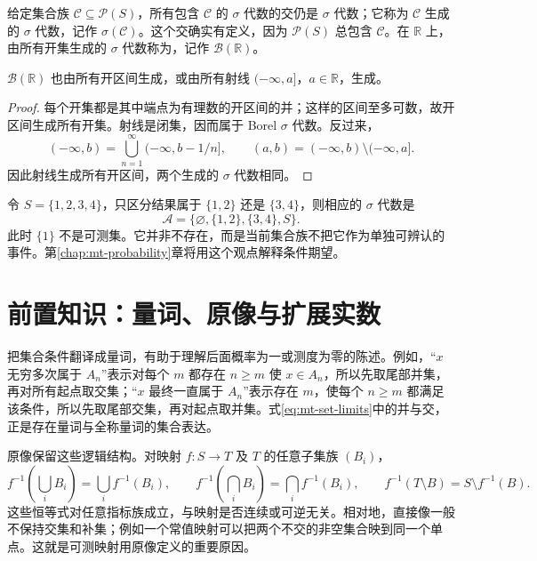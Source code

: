 \documentclass[UTF8,12pt,a4paper,fontset=fandol]{ctexbook}
\begin{document}
给定集合族 $\mathcal C\subseteq\mathcal P(S)$，所有包含 $\mathcal C$ 的 $\sigma$ 代数的交仍是 $\sigma$ 代数；它称为 $\mathcal C$ 生成的 $\sigma$ 代数，记作 $\sigma(\mathcal C)$。这个交确实有定义，因为 $\mathcal P(S)$ 总包含 $\mathcal C$。在 $\mathbb R$ 上，由所有开集生成的 $\sigma$ 代数称为，记作 $\mathcal B(\mathbb R)$。

\begin{proposition}
$\mathcal B(\mathbb R)$ 也由所有开区间生成，或由所有射线 $(-\infty,a]$，$a\in\mathbb R$，生成。
\end{proposition}
\begin{proof}
每个开集都是其中端点为有理数的开区间的并；这样的区间至多可数，故开区间生成所有开集。射线是闭集，因而属于 Borel $\sigma$ 代数。反过来，
\[
 (-\infty,b)=\bigcup_{n=1}^{\infty}(-\infty,b-1/n],\qquad
 (a,b)=(-\infty,b)\setminus(-\infty,a].
\]
因此射线生成所有开区间，两个生成的 $\sigma$ 代数相同。
\end{proof}

\begin{example}[有限信息对应的集合族]
令 $S=\{1,2,3,4\}$，只区分结果属于 $\{1,2\}$ 还是 $\{3,4\}$，则相应的 $\sigma$ 代数是
\[
 \mathcal A=\{\varnothing,\{1,2\},\{3,4\},S\}.
\]
此时 $\{1\}$ 不是可测集。它并非不存在，而是当前集合族不把它作为单独可辨认的事件。第\ref{chap:mt-probability}章将用这个观点解释条件期望。
\end{example}

\section{前置知识：量词、原像与扩展实数}
\label{sec:mt-logical-tools}
把集合条件翻译成量词，有助于理解后面概率为一或测度为零的陈述。例如，“$x$ 无穷多次属于 $A_n$”表示对每个 $m$ 都存在 $n\geq m$ 使 $x\in A_n$，所以先取尾部并集，再对所有起点取交集；“$x$ 最终一直属于 $A_n$”表示存在 $m$，使每个 $n\geq m$ 都满足该条件，所以先取尾部交集，再对起点取并集。式\eqref{eq:mt-set-limits}中的并与交，正是存在量词与全称量词的集合表达。

原像保留这些逻辑结构。对映射 $f:S\to T$ 及 $T$ 的任意子集族 $(B_i)$，
\[
 f^{-1}\!\left(\bigcup_iB_i\right)=\bigcup_if^{-1}(B_i),\qquad
 f^{-1}\!\left(\bigcap_iB_i\right)=\bigcap_if^{-1}(B_i),\qquad
 f^{-1}(T\setminus B)=S\setminus f^{-1}(B).
\]
这些恒等式对任意指标族成立，与映射是否连续或可逆无关。相对地，直接像一般不保持交集和补集；例如一个常值映射可以把两个不交的非空集合映到同一个单点。这就是可测映射用原像定义的重要原因。
\end{document}
